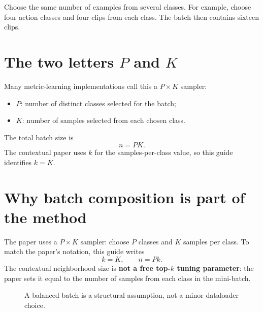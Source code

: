\documentclass[11pt,oneside,openany]{book}
\theoremstyle{myplain}
\theoremstyle{definition}
\begin{document}
\begin{conceptbox}[title=Plain-language definition of balanced sampling]
Choose the same number of examples from several classes. For example, choose four action classes and four clips from each class. The batch then contains sixteen clips.
\end{conceptbox}

\section{The two letters $P$ and $K$}

Many metric-learning implementations call this a $P\times K$ sampler:
\begin{itemize}[leftmargin=*]
  \item $P$: number of distinct classes selected for the batch;
  \item $K$: number of samples selected from each chosen class.
\end{itemize}
The total batch size is
\[
  n=PK.
\]
The contextual paper uses $k$ for the samples-per-class value, so this guide identifies $k=K$.



\section{Why batch composition is part of the method}

The paper uses a $P\times K$ sampler: choose $P$ classes and $K$ samples per class. To match the paper's notation, this guide writes
\[
  k=K,\qquad n=Pk.
\]
The contextual neighborhood size is \textbf{not a free top-$k$ tuning parameter}: the paper sets it equal to the number of samples from each class in the mini-batch.

\begin{figure}[H]
\centering
{}
\caption{A balanced batch is a structural assumption, not a minor dataloader choice.}
\label{fig:balanced-batch}
\end{figure}
\end{document}
